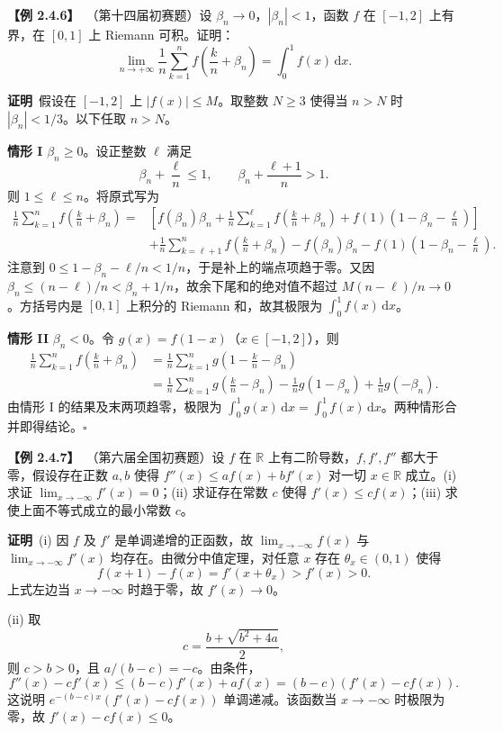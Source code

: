 \documentclass[UTF8,a4paper,11pt]{ctexart}
\newcommand{\ex}[1]{\par\medskip\noindent\textbf{【例 #1】}\ }
\newcommand{\pf}{\par\noindent\textbf{证明}\ }
\begin{document}
\ex{2.4.6}（第十四届初赛题）设 $\beta_n\to0$，$|\beta_n|<1$，函数 $f$ 在 $[-1,2]$ 上有界，在 $[0,1]$ 上 Riemann 可积。证明：
\[
\lim_{n\to+\infty}\frac1n\sum_{k=1}^{n}f\!\left(\frac{k}{n}+\beta_n\right)=\int_0^1 f(x)\,\mathrm dx.
\]
\pf 假设在 $[-1,2]$ 上 $|f(x)|\le M$。取整数 $N\ge3$ 使得当 $n>N$ 时 $|\beta_n|<1/3$。以下任取 $n>N$。

\textbf{情形 I} $\beta_n\ge0$。设正整数 $\ell$ 满足
\[
\beta_n+\frac\ell n\le1,\qquad \beta_n+\frac{\ell+1}{n}>1.
\]
则 $1\le\ell\le n$。将原式写为
\begin{align*}
\frac1n\sum_{k=1}^{n}f\!\left(\frac{k}{n}+\beta_n\right)
={}&\left[f(\beta_n)\beta_n+\frac1n\sum_{k=1}^{\ell}f\!\left(\frac{k}{n}+\beta_n\right)
+f(1)\left(1-\beta_n-\frac\ell n\right)\right]\\
&+\frac1n\sum_{k=\ell+1}^{n}f\!\left(\frac{k}{n}+\beta_n\right)
-f(\beta_n)\beta_n-f(1)\left(1-\beta_n-\frac\ell n\right).
\end{align*}
注意到 $0\le1-\beta_n-\ell/n<1/n$，于是补上的端点项趋于零。又因 $\beta_n\le(n-\ell)/n<\beta_n+1/n$，故余下尾和的绝对值不超过 $M(n-\ell)/n\to0$。方括号内是 $[0,1]$ 上积分的 Riemann 和，故其极限为 $\int_0^1 f(x)\,\mathrm dx$。

\textbf{情形 II} $\beta_n<0$。令 $g(x)=f(1-x)$（$x\in[-1,2]$），则
\begin{align*}
\frac1n\sum_{k=1}^{n}f\!\left(\frac{k}{n}+\beta_n\right)
&=\frac1n\sum_{k=1}^{n}g\!\left(1-\frac{k}{n}-\beta_n\right)\\
&=\frac1n\sum_{k=1}^{n}g\!\left(\frac{k}{n}-\beta_n\right)
-\frac1n g(1-\beta_n)+\frac1n g(-\beta_n).
\end{align*}
由情形 I 的结果及末两项趋零，极限为 $\int_0^1g(x)\,\mathrm dx=\int_0^1f(x)\,\mathrm dx$。两种情形合并即得结论。\hfill$\square$

\ex{2.4.7}（第六届全国初赛题）设 $f$ 在 $\mathbb R$ 上有二阶导数，$f,f',f''$ 都大于零，假设存在正数 $a,b$ 使得 $f''(x)\le a f(x)+b f'(x)$ 对一切 $x\in\mathbb R$ 成立。(i) 求证 $\lim_{x\to-\infty}f'(x)=0$；(ii) 求证存在常数 $c$ 使得 $f'(x)\le c f(x)$；(iii) 求使上面不等式成立的最小常数 $c$。
\pf (i) 因 $f$ 及 $f'$ 是单调递增的正函数，故 $\lim_{x\to-\infty}f(x)$ 与 $\lim_{x\to-\infty}f'(x)$ 均存在。由微分中值定理，对任意 $x$ 存在 $\theta_x\in(0,1)$ 使得
\[
f(x+1)-f(x)=f'(x+\theta_x)>f'(x)>0.
\]
上式左边当 $x\to-\infty$ 时趋于零，故 $f'(x)\to0$。

(ii) 取
\[
c=\frac{b+\sqrt{b^2+4a}}2,
\]
则 $c>b>0$，且 $a/(b-c)=-c$。由条件，
\[
f''(x)-cf'(x)\le(b-c)f'(x)+af(x)=(b-c)(f'(x)-cf(x)).
\]
这说明 $e^{-(b-c)x}(f'(x)-cf(x))$ 单调递减。该函数当 $x\to-\infty$ 时极限为零，故 $f'(x)-cf(x)\le0$。
\end{document}
